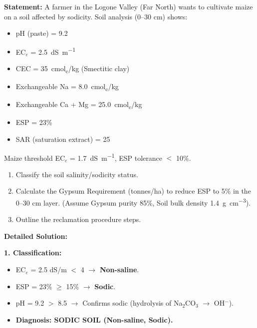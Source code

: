 \documentclass[11pt]{article}
\begin{document}
\begin{exoresolu}
\textbf{Statement:} A farmer in the Logone Valley (Far North) wants to cultivate maize on a soil affected by sodicity. Soil analysis (0--30 cm) shows:
\begin{itemize}
\item pH (paste) = 9.2
\item EC$_e$ = \SI{2.5}{dS.m^{-1}}
\item CEC = \SI{35}{cmol_{c}/kg} (Smectitic clay)
\item Exchangeable Na = \SI{8.0}{cmol_{c}/kg}
\item Exchangeable Ca + Mg = \SI{25.0}{cmol_{c}/kg}
\item ESP = 23\%
\item SAR (saturation extract) = 25
\end{itemize}
Maize threshold EC$_e$ = \SI{1.7}{dS.m^{-1}}, ESP tolerance $<$ 10\%.
\begin{enumerate}
\item Classify the soil salinity/sodicity status.
\item Calculate the Gypsum Requirement (tonnes/ha) to reduce ESP to 5\% in the 0--30 cm layer. (Assume Gypsum purity 85\%, Soil bulk density \SI{1.4}{g.cm^{-3}}).
\item Outline the reclamation procedure steps.
\end{enumerate}

\tcblower
\textbf{Detailed Solution:}

\noindent\textbf{1. Classification:}
\begin{itemize}
\item EC$_e$ = 2.5 dS/m $<$ 4 $\rightarrow$ \textbf{Non-saline}.
\item ESP = 23\% $\ge$ 15\% $\rightarrow$ \textbf{Sodic}.
\item pH = 9.2 $>$ 8.5 $\rightarrow$ Confirms sodic (hydrolysis of Na$_2$CO$_3$ $\rightarrow$ OH$^-$).
\item \textbf{Diagnosis: SODIC SOIL (Non-saline, Sodic).}
\end{itemize}


\end{exoresolu}
\end{document}
